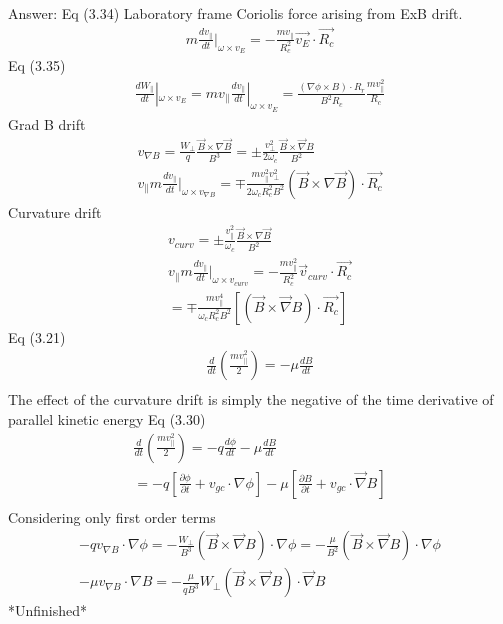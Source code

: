\documentclass{article}
\newcommand{\partialt}[1]{\frac{\partial #1}{\partial t}}
\begin{document}
Answer:
Eq (3.34) Laboratory frame Coriolis force arising from ExB drift. 
\begin{eqnarray*}
    m\frac{dv_\parallel}{dt}|_{\omega\times v_E}=-\frac{mv_\parallel}{R_c^2}\vec{v_E}\cdot \vec{R_c}
\end{eqnarray*}
Eq (3.35) 
\begin{eqnarray*}
    \frac{dW_\parallel}{dt}|_{\omega \times v_E}=m v_\parallel \frac{dv_\parallel}{dt}|_{\omega\times v_E}=\frac{(\nabla \phi \times B)\cdot R_r}{B^2 R_c}\frac{mv_\parallel^2}{R_c}
\end{eqnarray*}
Grad B drift
\begin{eqnarray*}
    v_{\nabla B}=\frac{W_\perp}{q}\frac{\vec{B}\times \nabla \vec{B}}{B^3}=\pm \frac{v_\perp^2}{2\omega_c}\frac{\vec{B}\times \vec{\nabla}B}{B^2}\\
    v_\parallel m \frac{dv_\parallel}{dt}|_{\omega \times v_{\nabla B}}=\mp \frac{m v_\parallel^2 v_\perp^2}{2\omega_c R_c^2 B^2}(\vec{B}\times \nabla \vec{B})\cdot \vec{R_c}
\end{eqnarray*}
Curvature drift
\begin{eqnarray*}
    v_{curv}=\pm \frac{v_\parallel^2}{\omega_c}\frac{\vec{B}\times \nabla \vec{B}}{B^2}\\
    v_\parallel m \frac{dv_\parallel}{dt}|_{\omega\times v_{curv}}=-\frac{mv_\parallel^2}{R_c^2}\vec{v}_{curv}\cdot \vec{R_c}\\
    =\mp \frac{m v_\parallel^4}{\omega_cR_c^2B^2}[(\vec{B}\times \vec{\nabla}B)\cdot \vec{R_c}]
\end{eqnarray*}
Eq (3.21) 
\begin{eqnarray*}
    \frac{d}{dt}(\frac{mv_\parallel^2}{2})=-\mu \frac{dB}{dt}\\
\end{eqnarray*}
The effect of the curvature drift is simply the negative of the time derivative of parallel kinetic energy
Eq (3.30)
\begin{eqnarray*}
    \frac{d}{dt}(\frac{mv_\parallel^2}{2})=-q \frac{d\phi}{dt}-\mu \frac{dB}{dt}\\
    =-q [\partialt{\phi}+v_{gc}\cdot\nabla\phi]-\mu[\partialt{B}+v_{gc}\cdot \vec{\nabla}B]\\
\end{eqnarray*}
Considering only first order terms
\begin{eqnarray*}
    -qv_{\nabla B}\cdot \nabla \phi=-\frac{W_\perp}{B^3}(\vec{B}\times \vec{\nabla}B)\cdot\nabla \phi=-\frac{\mu}{B^2}(\vec{B}\times\vec{\nabla}B)\cdot\nabla\phi\\
    -\mu v_{\nabla B}\cdot \nabla B=-\frac{\mu}{qB^3}W_\perp(\vec{B}\times \vec{\nabla}B)\cdot \vec{\nabla}B
\end{eqnarray*}
*Unfinished*
\end{document}

